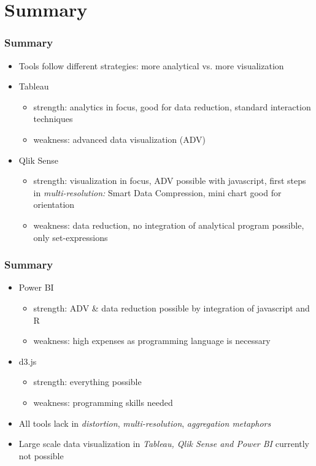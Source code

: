 \section{Summary}

\begin{frame}
	\frametitle{Summary}
	\begin{itemize}
		\item Tools follow different strategies: more analytical vs. more visualization
		\item Tableau
		\begin{itemize}
		    \item strength: analytics in focus, good for data reduction, standard interaction techniques
		    \item weakness: advanced data visualization (ADV)
		\end{itemize}
		\item Qlik Sense
		\begin{itemize}
		    \item strength: visualization in focus, ADV possible with javascript, first steps in \textit{multi-resolution:} Smart Data Compression, mini chart good for orientation
		    \item weakness: data reduction, no integration of analytical program possible, only set-expressions
		\end{itemize}
	\end{itemize}
\end{frame}

\begin{frame}
    \frametitle{Summary}
    \begin{itemize}
        \item Power BI
		\begin{itemize}
		    \item strength: ADV \& data reduction possible by integration of javascript and R
		    \item weakness: high expenses as programming language is necessary
		\end{itemize}
		\item d3.js
		\begin{itemize}
		    \item strength: everything possible
		    \item weakness: programming skills needed
		\end{itemize}
		\item All tools lack in \textit{distortion}, \textit{multi-resolution}, \textit{aggregation metaphors}
		\item Large scale data visualization in \textit{Tableau, Qlik Sense and Power BI} currently not possible
    \end{itemize}
\end{frame}
